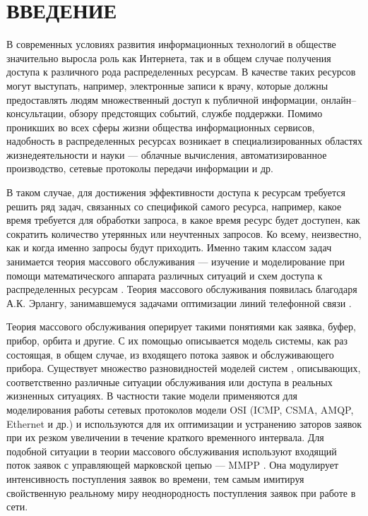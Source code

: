 \section*{ВВЕДЕНИЕ}
В современных условиях развития информационных технологий в обществе значительно выросла роль как Интернета, так и в общем случае получения доступа к различного рода распределенных ресурсам. В качестве таких ресурсов могут выступать, например, электронные записи к врачу, которые должны предоставлять людям множественный доступ к публичной информации, онлайн--консультации, обзору предстоящих событий, службе поддержки. Помимо проникших во всех сферы жизни общества информационных сервисов, надобность в распределенных ресурсах возникает в специализированных областях жизнедеятельности и науки --- облачные вычисления, автоматизированное производство, сетевые протоколы передачи информации и др.

В таком случае, для достижения эффективности доступа к ресурсам требуется решить ряд задач, связанных со спецификой самого ресурса, например, какое время требуется для обработки запроса, в какое время ресурс будет доступен, как сократить количество утерянных или неучтенных запросов. Ко всему, неизвестно, как и когда именно запросы будут приходить. Именно таким классом задач занимается теория массового обслуживания --- изучение и моделирование при помощи математического аппарата различных ситуаций и схем доступа к распределенных ресурсам \cite{nazarov2010theory}. Теория массового обслуживания появилась благодаря  А.К. Эрлангу, занимавшемуся задачами оптимизации линий телефонной связи \cite{erlang1909theory}.

Теория массового обслуживания оперирует такими понятиями как заявка, буфер, прибор, орбита и другие. С их помощью описывается модель системы, как раз состоящая, в общем случае, из входящего потока заявок и обслуживающего прибора. Существует множество разновидностей моделей систем \cite{phung2019retrial,artalejo2010accessible}, описывающих, соответственно различные ситуации обслуживания или доступа в реальных жизненных ситуациях. В частности такие модели применяются для моделирования работы сетевых протоколов модели OSI (ICMP, CSMA, AMQP, Ethernet и др.) \cite{bellovin2003icmp,bjornstad2006traffic,kritzinger1986performance,olypher2010computer} и используются для их оптимизации и устранению заторов заявок при их резком увеличении в течение краткого временного интервала. Для подобной ситуации в теории массового обслуживания используют входящий поток заявок с управляющей марковской цепью --- MMPP \cite{baiocchi1993steady,2019asymptotic}. Она модулирует интенсивность поступления заявок во времени, тем самым имитируя свойственную реальному миру неоднородность поступления заявок при работе в сети.
 
